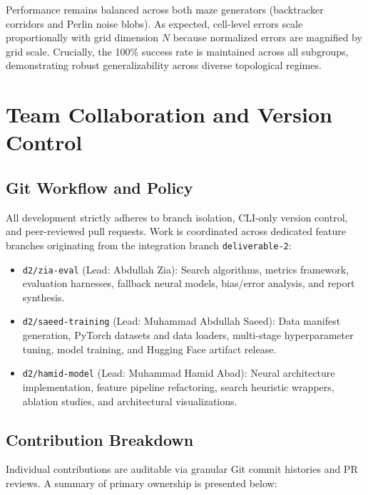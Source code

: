 \documentclass[11pt]{article}
\begin{document}
Performance remains balanced across both maze generators (backtracker corridors and Perlin noise blobs).
As expected, cell-level errors scale proportionally with grid dimension $N$ because normalized
errors are magnified by grid scale. Crucially, the 100\% success rate is maintained across all
subgroups, demonstrating robust generalizability across diverse topological regimes.


\section{Team Collaboration and Version Control}

\subsection{Git Workflow and Policy}
All development strictly adheres to branch isolation, CLI-only version control, and peer-reviewed
pull requests. Work is coordinated across dedicated feature branches originating from the integration
branch \texttt{deliverable-2}:
\begin{itemize}
    \item \texttt{d2/zia-eval} (Lead: Abdullah Zia): Search algorithms, metrics framework, evaluation harnesses, fallback neural models, bias/error analysis, and report synthesis.
    \item \texttt{d2/saeed-training} (Lead: Muhammad Abdullah Saeed): Data manifest generation, PyTorch datasets and data loaders, multi-stage hyperparameter tuning, model training, and Hugging Face artifact release.
    \item \texttt{d2/hamid-model} (Lead: Muhammad Hamid Abad): Neural architecture implementation, feature pipeline refactoring, search heuristic wrappers, ablation studies, and architectural visualizations.
\end{itemize}

\subsection{Contribution Breakdown}
Individual contributions are auditable via granular Git commit histories and PR reviews.
A summary of primary ownership is presented below:
\end{document}
